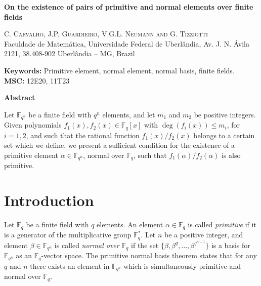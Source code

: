 \documentclass[12pt]{article}
\newcommand{\F}{\mathbb{F}}
\begin{document}
\begin{center}
{\Large\textbf{On the existence of pairs of primitive and normal 
elements over finite fields}}
\end{center}
\vspace{3ex}

\noindent\begin{center} 
\textsc{C. Carvalho, J.P. Guardieiro, V.G.L. Neumann and G. Tizziotti}\\ 
\vspace{1ex}
\small{Faculdade de Matem\'{a}tica, Universidade Federal de Uberl\^{a}ndia, 
Av. 
J. N. 
\'{A}vila  2121, 38.408-902 Uberl\^{a}ndia -- MG, Brazil }
\end{center}
%
%
%
%
%



\vspace{8ex}
\noindent
\textbf{Keywords:} Primitive element, normal element, normal basis, finite 
fields.\\
\noindent
\textbf{MSC:} 12E20, 11T23



\vspace{4ex}
\begin{small}
\begin{center}
\textbf{Abstract}
\end{center}
Let $\F_{q^n}$ be a finite field with $q^n$ elements, and let $m_1$ and $m_2$ 
be 
positive integers. Given polynomials  $f_1(x), f_2(x) \in \F_q[x]$ with 
$\deg(f_i(x)) \leq m_i$, for $i = 1, 2$, and such that the rational function 
$f_1(x)/f_2(x)$ 
belongs to a certain set which we define, we present a sufficient condition for 
the  existence of a primitive element $\alpha \in \F_{q^n}$, normal over 
$\F_q$, 
such that 
$f_1(\alpha)/f_2(\alpha)$ is also primitive.  
\end{small}


\section{Introduction}
Let $\F_q$ be a finite field with $q$ elements. 
An element $\alpha\in\mathbb{F}_q$ is called \textit{primitive} if it is a 
generator of the multiplicative group $\mathbb{F}_q^*$. Let $n$ be a positive 
integer, and element $\beta \in \mathbb{F}_{q^n}$ is called \textit{normal over 
$\F_q$} if the set $\{\beta, \beta^q, \ldots, \beta^{q^{n - 1}} \}$ 
is a basis for 
$\mathbb{F}_{q^n}$ as an  $\mathbb{F}_q$-vector space. The primitive normal 
basis theorem states that for any $q$ and $n$ there exists an element in 
$\mathbb{F}_{q^n}$ which is simultaneously primitive and normal over $\F_q$. 
\end{document}
